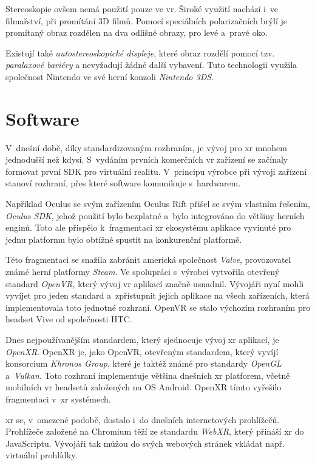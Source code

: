 Stereoskopie ovšem nemá použití pouze ve \gls{vr}. Široké využití nachází i~ve filmařství, při promítání 3D filmů. Pomocí speciálních polarizačních brýlí je promítaný obraz rozdělen na dva odlišné obrazy, pro levé a~pravé oko. \cite{unitedfilm_stereoskopie}

Existují také \textit{autostereoskopické displeje}, které obraz rozdělí pomocí tzv. \textit{paralaxové bariéry} a nevyžadují žádné další vybavení. Tuto technologii využila společnost Nintendo ve své herní konzoli \textit{Nintendo 3DS}. \cite{enwiki:1158939127}

\chapter{Software}

V~dnešní době, díky standardizovaným rozhraním, je vývoj pro \gls{xr} mnohem jednodušší než kdysi. S~vydáním prvních komerčních \gls{vr} zařízení se začínaly formovat první \gls{SDK} pro virtuální realitu. V~principu výrobce při vývoji zařízení stanoví rozhraní, přes které software komunikuje s~hardwarem. 

Například Oculus se svým zařízením Oculus Rift přišel se svým vlastním řešením, \textit{Oculus SDK}, jehož použití bylo bezplatné a~bylo integrováno do většiny herních enginů. \cite{enwiki:1193283032} Toto ale přispělo k~fragmentaci \gls{xr} ekosystému \poml aplikace vyvinuté pro jednu platformu bylo obtížné spustit na konkurenční platformě.

Této fragmentaci se snažila zabránit americká společnost \textit{Valve}, provozovatel známé herní platformy \textit{Steam}. Ve spolupráci s~výrobci vytvořila otevřený standard \textit{OpenVR}, který vývoj \gls{vr} aplikací značně usnadnil. Vývojáři nyní mohli vyvíjet pro jeden standard a~zpřístupnit jejich aplikace na všech zařízeních, která implementovala toto jednotné rozhraní. OpenVR se stalo výchozím rozhraním pro headset Vive od společnosti HTC. \cite{enwiki:1192992480}

Dnes nejpoužívanějším standardem, který sjednocuje vývoj \gls{xr} aplikací, je \textit{OpenXR}. OpenXR je, jako OpenVR, otevřeným standardem, který vyvíjí konsorcium \textit{Khronos Group}, které je taktéž známé pro standardy \textit{OpenGL} a~\textit{Vulkan}. Toto rozhraní implementuje většina dnešních \gls{xr} platforem, včetně mobilních \gls{vr} headsetů založených na OS Android. OpenXR tímto vyřešilo fragmentaci v~\gls{xr} systémech. \cite{enwiki:1186405367}

\gls{xr} se, v~omezené podobě, dostalo i~do dnešních internetových prohlížečů. Prohlížeče založené na Chromium těží ze standardu \textit{WebXR}, který přináší \gls{xr} do JavaScriptu. Vývojáři tak můžou do svých webových stránek vkládat např. virtuální prohlídky. \cite{webxr_mdn}

